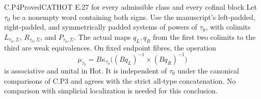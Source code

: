 \begin{result}{C.P4}{Proved}{CATHOT E.27 for every admissible class and every cofinal block}
Let $\tau_0$ be a nonempty word containing both signs. Use the manuscript's left-padded, right-padded, and symmetrically padded systems of powers of $\tau_0$, with colimits $L_{\tau_0,\Sigma}$, $R_{\tau_0,\Sigma}$, and $P_{\tau_0,\Sigma}$. The actual maps $q_L,q_R$ from the first two colimits to the third are weak equivalences. On fixed endpoint fibres, the operation
\[
 \mu_{\tau_0}=B\kappa_{\tau_0}
       \bigl((Bq_L)^{-1}\times(Bq_R)^{-1}\bigr)
\]
is associative and unital in $\mathrm{Hot}$. It is independent of $\tau_0$ under the canonical comparisons of C.P3 and agrees with the strict all-type concatenation. No comparison with simplicial localization is needed for this conclusion.
\end{result}
